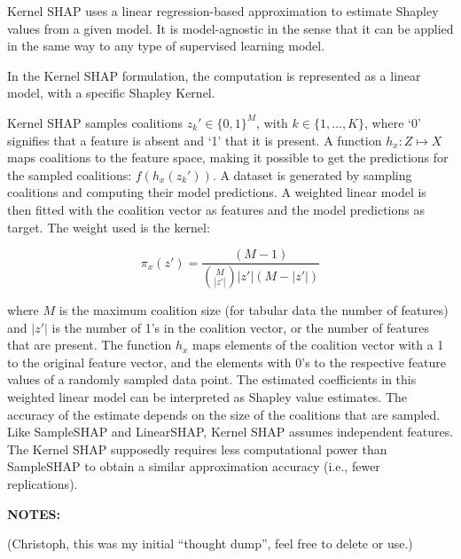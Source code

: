 Kernel SHAP \citet{lundberg-2017-KernelSHAP} uses a linear regression-based approximation to estimate Shapley values from a given model. It is model-agnostic in the sense that it can be applied in the same way to any type of supervised learning model.

In the Kernel SHAP formulation, the computation is represented as a linear model, with a specific Shapley Kernel.

Kernel SHAP samples coalitions \(z_k' \in \{0,1\}^M\), with \(k \in \{1, \ldots, K\}\), where `0' signifies that a feature is absent and `1' that it is present.
A function \(h_x: Z \mapsto X\) maps coalitions to the feature space, making it possible to get the predictions for the sampled coalitions: \(f(h_x(z_k'))\).
A dataset is generated by sampling coalitions and computing their model predictions.
A weighted linear model is then fitted with the coalition vector as features and the model predictions as target.
The weight used is the kernel:

\[\pi_{x}(z')=\frac{(M-1)}{\binom{M}{|z'|}|z'|(M-|z'|)}\]

where \(M\) is the maximum coalition size (for tabular data the number of features) and \(|z'|\) is the number of 1's in the coalition vector, or the number of features that are present.
The function \(h_x\) maps elements of the coalition vector with a 1 to the original feature vector, and the elements with 0's to the respective feature values of a randomly sampled data point.
The estimated coefficients in this weighted linear model can be interpreted as Shapley value estimates.
The accuracy of the estimate depends on the size of the coalitions that are sampled.
Like SampleSHAP and LinearSHAP, Kernel SHAP assumes independent features.
The Kernel SHAP supposedly requires less computational power than SampleSHAP to obtain a similar approximation accuracy (i.e., fewer replications).

\textbf{NOTES:}

(Christoph, this was my initial ``thought dump'', feel free to delete or use.)

